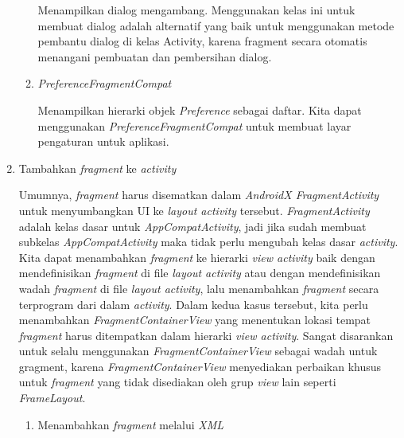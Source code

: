 \begin{enumerate}
\begin{enumerate}
	Menampilkan dialog mengambang. Menggunakan kelas ini untuk membuat dialog adalah alternatif yang baik untuk menggunakan metode pembantu dialog di kelas Activity, karena fragment secara otomatis menangani pembuatan dan pembersihan dialog.
	\item \emph{PreferenceFragmentCompat}
	
	Menampilkan hierarki objek \textit{Preference} sebagai daftar. Kita dapat menggunakan \textit{PreferenceFragmentCompat} untuk membuat layar pengaturan untuk aplikasi.
	\end{enumerate}
\item Tambahkan \textit{fragment} ke \textit{activity}

Umumnya, \textit{fragment} harus disematkan dalam \textit{AndroidX FragmentActivity} untuk menyumbangkan UI ke \textit{layout activity} tersebut. \textit{FragmentActivity} adalah kelas dasar untuk \textit{AppCompatActivity}, jadi jika sudah membuat subkelas \textit{AppCompatActivity} maka tidak perlu mengubah kelas dasar \textit{activity}.
Kita dapat menambahkan \textit{fragment} ke hierarki \textit{view activity} baik dengan mendefinisikan \textit{fragment} di file \textit{layout activity} atau dengan mendefinisikan wadah \textit{fragment} di file \textit{layout activity}, lalu menambahkan \textit{fragment} secara terprogram dari dalam \textit{activity}. Dalam kedua kasus tersebut, kita perlu menambahkan \textit{FragmentContainerView} yang menentukan lokasi tempat \textit{fragment} harus ditempatkan dalam hierarki \textit{view activity}. Sangat disarankan untuk selalu menggunakan \textit{FragmentContainerView} sebagai wadah untuk gragment, karena \textit{FragmentContainerView} menyediakan perbaikan khusus untuk \textit{fragment} yang tidak disediakan oleh grup \textit{view} lain seperti \textit{FrameLayout}.
	\begin{enumerate}
	\item Menambahkan \textit{fragment} melalui \textit{XML}
	

\end{enumerate}
\end{enumerate}
